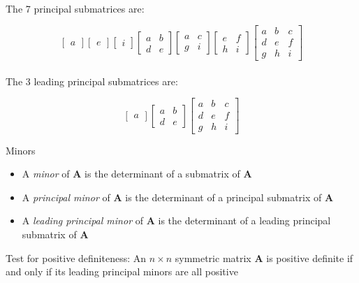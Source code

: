\documentclass[10pt]{seminar}
\begin{document}
\begin{slide}
\ \\The 7 principal submatrices are:

$$\begin{bmatrix}
a
\end{bmatrix}
\begin{bmatrix}
e
\end{bmatrix}
\begin{bmatrix}
i
\end{bmatrix}
\begin{bmatrix}
a & b\\ d& e
\end{bmatrix}
\begin{bmatrix}
a & c\\g& i
\end{bmatrix}
\begin{bmatrix}
e& f\\h& i
\end{bmatrix}
\begin{bmatrix}
a& b& c\\
d& e& f\\
g& h& i
\end{bmatrix}$$
\ \\The 3 leading principal submatrices are:

$$\begin{bmatrix}
a
\end{bmatrix}
\begin{bmatrix}
a & b\\ d& e
\end{bmatrix}
\begin{bmatrix}
a& b& c\\
d& e& f\\
g& h& i
\end{bmatrix}$$

\newslide
Minors

\begin{itemize}
\item A \textit{minor} of $\mathbf{A} $ is the determinant of a submatrix of $\mathbf{A} $
\item A \textit{ principal minor} of $\mathbf{A} $ is the determinant of a principal submatrix of $\mathbf{A} $
\item A \textit{leading principal minor} of $\mathbf{A} $ is the determinant of a leading principal submatrix of $\mathbf{A} $
\end{itemize}
\vspace{.1in}

Test for positive definiteness: An $n\times n$ symmetric matrix $\mathbf{A}$ is positive definite if and only if its leading principal minors are all positive


\end{slide}
\end{document}
